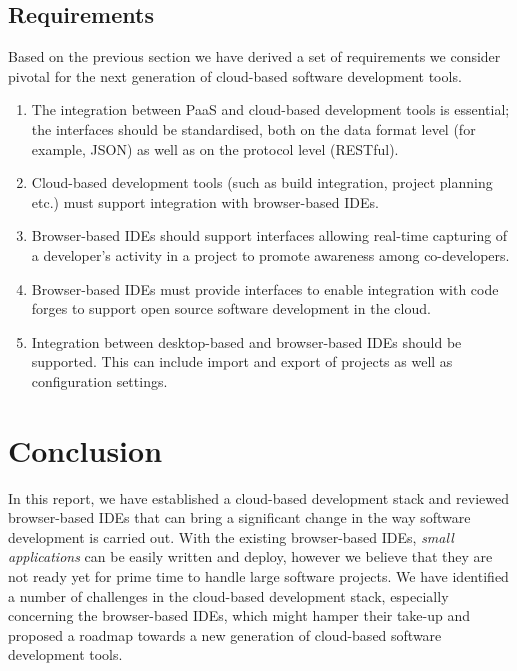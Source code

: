 \documentclass[11pt,fleqn,twoside]{article}
\begin{document}
\subsection{Requirements} \label{sec:requirements}
Based on the previous section we have derived a set of requirements we consider pivotal for the next generation of cloud-based software development tools.
\begin{enumerate}
	\item The integration between PaaS and cloud-based development tools is essential; the interfaces should be standardised, both on the data format level (for example, JSON) as well as on the protocol level (RESTful).
	\item Cloud-based development tools (such as build integration, project planning etc.) must support integration with browser-based IDEs.
	\item Browser-based IDEs should support interfaces allowing real-time capturing of a developer's activity in a project to promote awareness among co-developers.
	\item Browser-based IDEs must provide interfaces to enable integration with code forges to support open source software development in the cloud.
	\item Integration between desktop-based and browser-based IDEs should be supported. This can include import and export of projects as well as configuration settings.
\end{enumerate}


\section{Conclusion} \label{sec:conclusion}
In this report, we have established a cloud-based development stack and reviewed browser-based IDEs that can bring a significant change in the way software development is carried out. With the existing browser-based IDEs, \emph{small applications } can be easily written and deploy, however we believe that they are not ready yet for prime time to handle large software projects. We have identified a number of challenges in the cloud-based development stack, especially concerning the browser-based IDEs, which might hamper their take-up and proposed a roadmap towards a new generation of cloud-based software development tools.





%
%

\end{document}
